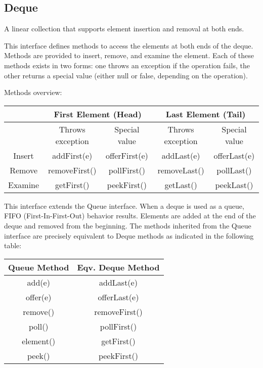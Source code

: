 \documentclass{scrartcl}
\begin{document}
\subsection{Deque}

    A linear collection that supports element insertion and removal at both ends.

    This interface defines methods to access the elements at both ends of the deque. Methods are provided to insert, remove, and examine the element. Each of these methods exists in two forms: one throws an exception if the operation fails, the other returns a special value (either null or false, depending on the operation).

    Methods overview:
    \begin{tabular}{|c|c|c|c|c|}
        \hline
        &  \multicolumn{2}{c}{First Element (Head)} & \multicolumn{2}{c}{Last Element (Tail)} \\
        \hline
        & Throws exception & Special value  & Throws exception & Special value  \\
        \hline
        Insert & addFirst(e) & offerFirst(e) & addLast(e) & offerLast(e) \\
        \hline
        Remove& removeFirst() & pollFirst() & removeLast() & pollLast() \\
        \hline
        Examine& getFirst() & peekFirst() & getLast() &  peekLast()\\
        \hline
    \end{tabular}

    This interface extends the Queue interface. When a deque is used as a queue, FIFO (First-In-First-Out) behavior results. Elements are added at the end of the deque and removed from the beginning. The methods inherited from the Queue interface are precisely equivalent to Deque methods as indicated in the following table:

    \begin{tabular}{|c|c|}
        \hline
        Queue Method& Eqv. Deque Method \\
        \hline
        add(e) &	addLast(e)  \\
        \hline
        offer(e) &	offerLast(e)  \\
        \hline
        remove() & 	removeFirst() \\
        \hline
        poll() &	pollFirst()  \\
        \hline
        element() &	getFirst()  \\
        \hline
        peek() &	peekFirst()  \\
        \hline
    \end{tabular}
\end{document}
